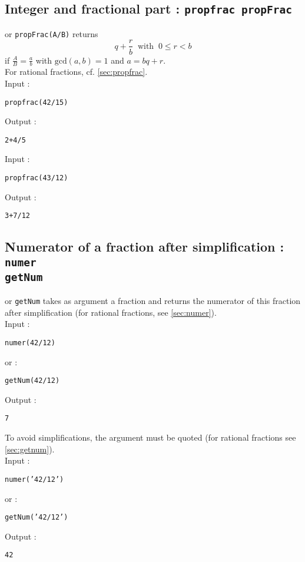 \documentclass[a4paper,11pt]{book}
\begin{document}
\subsection{Integer and fractional part : {\tt propfrac propFrac}}\label{sec:ipropfrac}
 or {\tt propFrac(A/B)} returns 
$$q+\frac{r}{b}\ \mbox{ with } \ 0\leq r<b$$ 
if  $\displaystyle \frac{A}{B}=\frac{a}{b}$ with $\mbox{gcd}(a,b)=1$
and $a=bq+r$.\\
For rational fractions, cf. \ref{sec:propfrac}.\\
Input :
\begin{center}{\tt propfrac(42/15)}\end{center}
Output :
\begin{center}{\tt 2+4/5}\end{center}
Input :
\begin{center}{\tt  propfrac(43/12)}\end{center}
Output :
\begin{center}{\tt  3+7/12}\end{center}

\subsection{Numerator of a fraction after simplification : {\tt numer}\\
{\tt getNum}}\label{sec:inumer}
 or {\tt getNum} takes as argument a fraction and returns 
the numerator of this fraction  after simplification (for rational fractions,
see \ref{sec:numer}).\\
Input :
\begin{center}{\tt  numer(42/12)}\end{center}
or :
\begin{center}{\tt getNum(42/12)}\end{center}
Output :
\begin{center}{\tt 7}\end{center}
To avoid simplifications, the argument must
be quoted (for rational fractions see \ref{sec:getnum}).\\
Input :
\begin{center}{\tt  numer('42/12')}\end{center}
or :
\begin{center}{\tt  getNum('42/12')}\end{center}
Output :
\begin{center}{\tt 42}\end{center}
\end{document}
